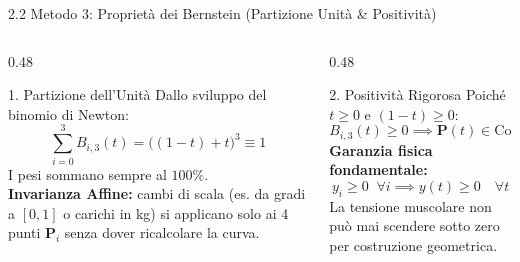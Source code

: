 \documentclass[aspectratio=169, 10pt]{beamer}
\begin{document}
\begin{frame}{2.2 Metodo 3: Proprietà dei Bernstein (Partizione Unità \& Positività)}
    \begin{columns}[T]
        \begin{column}{0.48\textwidth}
            \begin{exampleblock}{1. Partizione dell'Unità}
                Dallo sviluppo del binomio di Newton:
                $$\sum_{i=0}^3 B_{i,3}(t) = \big((1-t) + t\big)^3 \equiv 1$$
                \footnotesize I pesi sommano sempre al $100\%$.
                \vspace{0.1cm} \\
                \textbf{Invarianza Affine:} cambi di scala (es. da gradi a $[0, 1]$ o carichi in kg) si applicano solo ai 4 punti $\mathbf{P}_i$ senza dover ricalcolare la curva.
            \end{exampleblock}
        \end{column}
        \begin{column}{0.48\textwidth}
            \begin{alertblock}{2. Positività Rigorosa}
                Poiché $t \ge 0$ e $(1-t) \ge 0$:
                $$B_{i,3}(t) \ge 0 \implies \mathbf{P}(t) \in \text{Conv}(\{\mathbf{P}_i\})$$
                \footnotesize \textbf{Garanzia fisica fondamentale:}
                $$y_i \ge 0 \;\; \forall i \implies y(t) \ge 0 \quad \forall t$$
                La tensione muscolare non può mai scendere sotto zero per costruzione geometrica.
            \end{alertblock}
        \end{column}
    \end{columns}
\end{frame}
\end{document}
